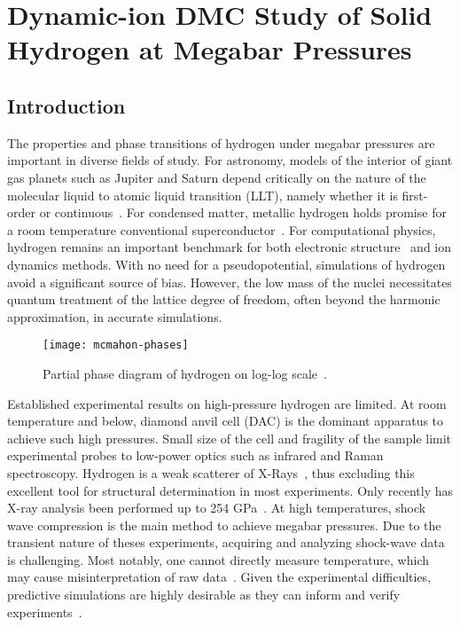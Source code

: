 \chapter{Dynamic-ion DMC Study of Solid Hydrogen at Megabar Pressures}
\label{chap:hsolid}
\section{Introduction}

The properties and phase transitions of hydrogen under megabar pressures are important in diverse fields of study. For astronomy, models of the interior of giant gas planets such as Jupiter and Saturn depend critically on the nature of the molecular liquid to atomic liquid transition (LLT), namely whether it is first-order or continuous~\cite{Hubbard2016,Wahl2017}. For condensed matter, metallic hydrogen holds promise for a room temperature conventional superconductor~\cite{McMahon2011,McMahon2012}. For computational physics, hydrogen remains an important benchmark for both electronic structure~\cite{Motta2017} and ion dynamics methods. With no need for a pseudopotential, simulations of hydrogen avoid a significant source of bias. However, the low mass of the nuclei necessitates quantum treatment of the lattice degree of freedom, often beyond the harmonic approximation, in accurate simulations.

\begin{figure}[h]
\centering
\texttt{[image: mcmahon-phases]}
\caption{Partial phase diagram of hydrogen on log-log scale~\cite{McMahon2012rmp}.}
\end{figure}

Established experimental results on high-pressure hydrogen are limited. At room temperature and below, diamond anvil cell (DAC) is the dominant apparatus to achieve such high pressures. Small size of the cell and fragility of the sample limit experimental probes to low-power optics such as infrared and Raman spectroscopy\cite{RangaI.F.2017}. Hydrogen is a weak scatterer of X-Rays~\cite{Zha2014}, thus excluding this excellent tool for structural determination in most experiments. Only recently has X-ray analysis been performed up to 254 GPa~\cite{Akahama2010,Ji2019}.
At high temperatures, shock wave compression is the main method to achieve megabar pressures. Due to the transient nature of theses experiments, acquiring and analyzing shock-wave data is challenging. Most notably, one cannot directly measure temperature, which may cause misinterpretation of raw data~\cite{Celliers2018,Knudson2004,Knudson2017}.
Given the experimental difficulties, predictive simulations are highly desirable as they can inform and verify experiments~\cite{Pierleoni2016b}.

